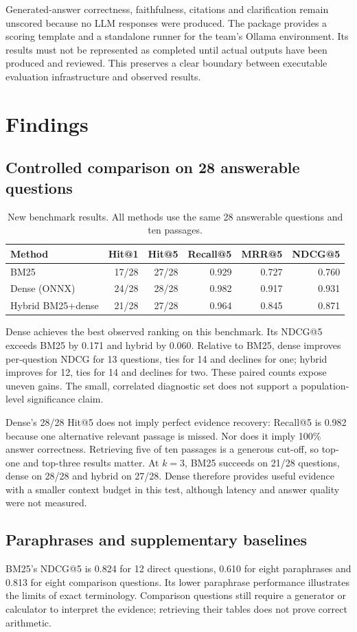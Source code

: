 \documentclass[11pt,a4paper]{article}
\begin{document}
Generated-answer correctness, faithfulness, citations and clarification remain unscored because no LLM responses were produced. The package provides a scoring template and a standalone runner for the team's Ollama environment. Its results must not be represented as completed until actual outputs have been produced and reviewed. This preserves a clear boundary between executable evaluation infrastructure and observed results.

\section{Findings}
\subsection{Controlled comparison on 28 answerable questions}
\begin{table}[htbp]\centering\small
\caption{New benchmark results. All methods use the same 28 answerable questions and ten passages.}
\begin{tabular}{lrrrrr}\toprule
Method & Hit@1 & Hit@5 & Recall@5 & MRR@5 & NDCG@5\\\midrule
BM25 &17/28&27/28&0.929&0.727&0.760\\
Dense (ONNX) &24/28&28/28&0.982&0.917&0.931\\
Hybrid BM25+dense &21/28&27/28&0.964&0.845&0.871\\\bottomrule
\end{tabular}
\end{table}
Dense achieves the best observed ranking on this benchmark. Its NDCG@5 exceeds BM25 by 0.171 and hybrid by 0.060. Relative to BM25, dense improves per-question NDCG for 13 questions, ties for 14 and declines for one; hybrid improves for 12, ties for 14 and declines for two. These paired counts expose uneven gains. The small, correlated diagnostic set does not support a population-level significance claim.

Dense's 28/28 Hit@5 does not imply perfect evidence recovery: Recall@5 is 0.982 because one alternative relevant passage is missed. Nor does it imply 100\% answer correctness. Retrieving five of ten passages is a generous cut-off, so top-one and top-three results matter. At $k=3$, BM25 succeeds on 21/28 questions, dense on 28/28 and hybrid on 27/28. Dense therefore provides useful evidence with a smaller context budget in this test, although latency and answer quality were not measured.

\subsection{Paraphrases and supplementary baselines}
BM25's NDCG@5 is 0.824 for 12 direct questions, 0.610 for eight paraphrases and 0.813 for eight comparison questions. Its lower paraphrase performance illustrates the limits of exact terminology. Comparison questions still require a generator or calculator to interpret the evidence; retrieving their tables does not prove correct arithmetic.
\end{document}
